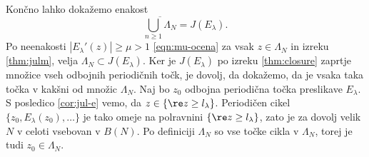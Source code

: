 \noindent Končno lahko dokažemo enakost
\[\overline{\bigcup_{n \geq 1} \Lambda_N} = J (E_\lambda).\]
Po neenakosti \(|E_\lambda' (z)| \geq \mu > 1\) \eqref{eqn:mu-ocena} za vsak \(z \in \Lambda_N\) in izreku \ref{thm:julm}, velja \(\Lambda_N \subset J (E_\lambda)\). Ker je \(J (E_\lambda)\) po izreku \ref{thm:closure} zaprtje množice vseh odbojnih periodičnih točk, je dovolj, da dokažemo, da je vsaka taka točka v kakšni od množic \(\Lambda_N\). Naj bo \(z_0\) odbojna periodična točka preslikave \(E_\lambda\). S posledico \ref{cor:jul-e} vemo, da \(z \in \{\re z \geq l_\lambda\}\). Periodičen cikel \(\{z_0, E_\lambda (z_0), \dots\}\) je tako omeje na polravnini \(\{\re z \geq l_\lambda\}\), zato je za dovolj velik \(N\) v celoti vsebovan v \(B (N)\). Po definiciji \(\Lambda_N\) so vse točke cikla v \(\Lambda_N\), torej je tudi \(z_0 \in \Lambda_N\).

